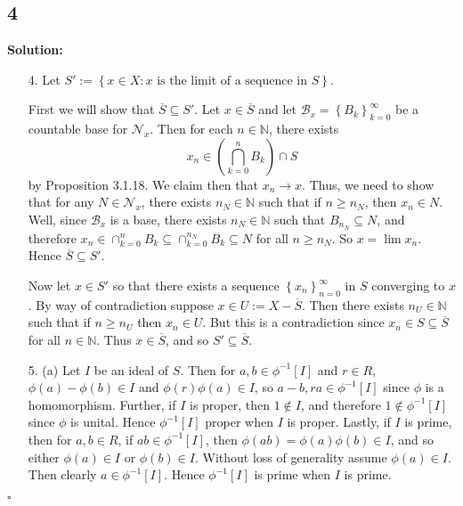 \documentclass[12pt]{article}
\newcounter{ProofCounter}
\newenvironment{Solution}{\stepcounter{ProofCounter}\textbf{Solution:}}{\hfill$\square$}
\begin{document}
\newpage
\subsection*{4}
\begin{Solution}
  \begin{enumerate}
    \item[4.] Let $S' := \left\{ x \in X : x \text{ is the limit of a sequence in }S \right\}$.

      First we will show that $\overline{S} \subseteq S'$. 
      Let $x \in \overline{S}$ and let $\mathcal{B}_x = \left\{ B_k \right\}_{k=0}^{\infty}$ be a countable base for $\mathcal{N}_x$. Then for
      each $n \in \mathbb{N}$, there exists 
      \[
        x_n \in \left( \bigcap_{k=0}^{n}B_k \right) \cap S
      \]
      by Proposition 3.1.18. We claim then that $x_n \rightarrow x$. Thus, we need to show that for any $N \in \mathcal{N}_x$, there exists $n_{N} \in
      \mathbb{N}$ such that if $n \geq n_{N}$, then $x_n \in N$. Well, since $\mathcal{B}_x$ is a base, there exists $n_{N} \in \mathbb{N}$ such that
      $B_{n_N} \subseteq N$, and therefore $x_n \in \cap_{k=0}^{n}B_{k} \subseteq \cap_{k=0}^{n_{N}}B_k \subseteq N$ for all $n \geq n_{N}$.
      So $x = \lim x_n$. Hence $\overline{S} \subseteq S'$.

      Now let $x \in S'$ so that there exists a sequence $\left\{ x_n \right\}_{n=0}^{\infty}$ in $S$ converging to $x$. By way of contradiction
      suppose $x \in U:= X - \overline{S}$. Then there exists $n_{U} \in \mathbb{N}$ such that if $n \geq n_{U}$ then $x_n \in U$. But this is a
      contradiction since $x_n \in S \subseteq \overline{S}$ for all $n \in \mathbb{N}$. Thus $x \in \overline{S}$, and so $S' \subseteq
      \overline{S}$.

    \item[5.] (a) Let $I$ be an ideal of $S$. Then for $a,b \in \phi^{-1}[I]$ and $r \in R$, $\phi(a) - \phi(b) \in I$ and $\phi(r)\phi(a) \in I$, so
      $a - b, ra \in \phi^{-1}[I]$ since $\phi$ is a homomorphism. Further, if $I$ is proper, then $1 \notin I$, and therefore $1 \notin \phi^{-1}[I]$
      since $\phi$ is unital. Hence $\phi^{-1}[I]$ proper when $I$ is proper. Lastly, if $I$ is prime, then for $a, b \in R$, if $ab \in
      \phi^{-1}[I]$, then $\phi(ab) = \phi(a)\phi(b) \in I$, and so either $\phi(a) \in I$ or $\phi(b) \in I$. Without loss of generality assume
      $\phi(a) \in I$. Then clearly $a \in \phi^{-1}[I]$. Hence $\phi^{-1}[I]$ is prime when $I$ is prime.


\end{enumerate}
\end{Solution}
\end{document}
